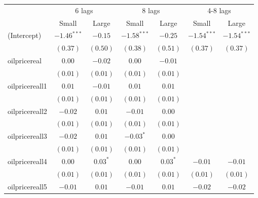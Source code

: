 \documentclass[12pt]{article}
\begin{document}
\begin{table}
\begin{center}
\begin{tabular}{l c c c c c c }
\hline
	&\multicolumn{2}{|c|}{6 lags} & \multicolumn{2}{c}{8 lags} &\multicolumn{2}{c}{4-8 lags} \\
                                     & Small & Large & Small  & Large & Small & Large\\
\hline
(Intercept)                          & $-1.46^{***}$ & $-0.15$       & $-1.58^{***}$ & $-0.25$       & $-1.54^{***}$ & $-1.54^{***}$ \\
                                     & $(0.37)$      & $(0.50)$      & $(0.38)$      & $(0.51)$      & $(0.37)$      & $(0.37)$      \\
oilpricereal                       & $0.00$        & $-0.02$       & $0.00$        & $-0.01$       &               &               \\
                                     & $(0.01)$      & $(0.01)$      & $(0.01)$      & $(0.01)$      &               &               \\
oilpricereall1                    & $0.01$        & $-0.01$       & $0.01$        & $0.01$        &               &               \\
                                     & $(0.01)$      & $(0.01)$      & $(0.01)$      & $(0.01)$      &               &               \\
oilpricereall2                    & $-0.02$       & $0.01$        & $-0.01$       & $0.00$        &               &               \\
                                     & $(0.01)$      & $(0.01)$      & $(0.01)$      & $(0.01)$      &               &               \\
oilpricereall3                    & $-0.02$       & $0.01$        & $-0.03^{*}$   & $0.00$        &               &               \\
                                     & $(0.01)$      & $(0.01)$      & $(0.01)$      & $(0.01)$      &               &               \\
oilpricereall4                    & $0.00$        & $0.03^{*}$    & $0.00$        & $0.03^{*}$    & $-0.01$       & $-0.01$       \\
                                     & $(0.01)$      & $(0.01)$      & $(0.01)$      & $(0.01)$      & $(0.01)$      & $(0.01)$      \\
oilpricereall5                    & $-0.01$       & $0.01$        & $-0.01$       & $0.01$        & $-0.02$       & $-0.02$       \\

\end{tabular}
\end{center}
\end{table}
\end{document}
